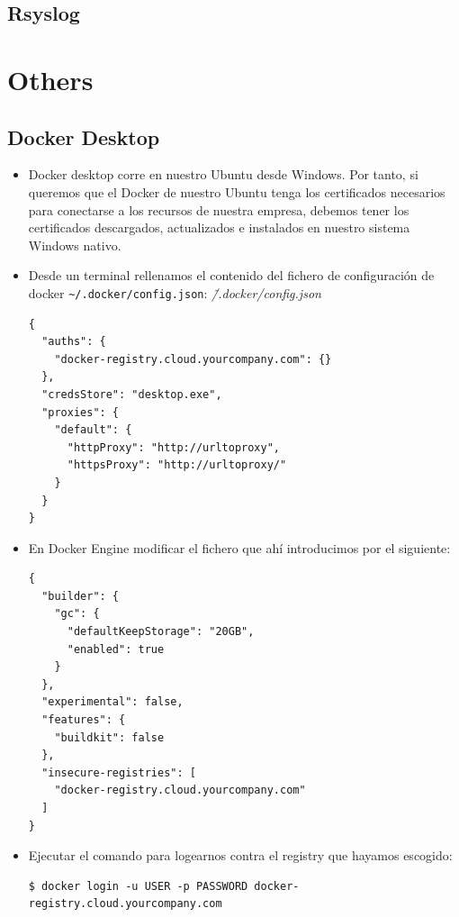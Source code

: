 \documentclass{article}
\newenvironment{codetemplate}[1][]{%
  \mybasecolorbox[#1]
  \itshape
}{%
  \endmybasecolorbox
}
\begin{document}
\subsection{Rsyslog}





\newpage
\section{Others}

\subsection{Docker Desktop}

\begin{itemize}
    \item Docker desktop corre en nuestro Ubuntu desde Windows. Por tanto, si queremos que el Docker de nuestro Ubuntu tenga los certificados necesarios para conectarse a los recursos de nuestra empresa, debemos tener los certificados descargados, actualizados e instalados en nuestro sistema Windows nativo.
    \item Desde un terminal rellenamos el contenido del fichero de configuración de docker \verb|~/.docker/config.json|:
\begin{codetemplate}{\~/.docker/config.json}
\begin{verbatim}
{
  "auths": {
    "docker-registry.cloud.yourcompany.com": {}
  },
  "credsStore": "desktop.exe",
  "proxies": {
    "default": {
      "httpProxy": "http://urltoproxy",
      "httpsProxy": "http://urltoproxy/"
    }
  }
}
\end{verbatim}
\end{codetemplate}

    \item En Docker Engine modificar el fichero que ahí introducimos por el siguiente:
\begin{codetemplate}{}
\begin{verbatim}
{
  "builder": {
    "gc": {
      "defaultKeepStorage": "20GB",
      "enabled": true
    }
  },
  "experimental": false,
  "features": {
    "buildkit": false
  },
  "insecure-registries": [
    "docker-registry.cloud.yourcompany.com"
  ]
}
\end{verbatim}
\end{codetemplate}

    \item Ejecutar el comando para logearnos contra el registry que hayamos escogido:
\begin{codetemplate}{}
\begin{verbatim}
$ docker login -u USER -p PASSWORD docker-registry.cloud.yourcompany.com
\end{verbatim}
\end{codetemplate}


\end{itemize}
\end{document}
